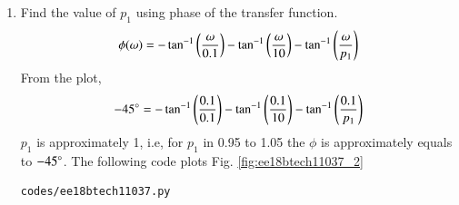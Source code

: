 \begin{enumerate}[label=\thesubsection.\arabic*.,ref=\thesubsection.\theenumi]
\item Find the value of $p_1$ using phase of the transfer function.
\\
\solution
\begin{align}
\phi(\omega) = -\tan^{-1} \left(\frac{\omega}{0.1}\right)-\tan^{-1} \left(\frac{\omega}{10}\right)-\tan^{-1} \left(\frac{\omega}{p_1}\right)
\end{align}
From the plot,
\begin{align}
-45\degree = -\tan^{-1}\left(\frac{0.1}{0.1}\right) -\tan^{-1}\left(\frac{0.1}{10}\right) -\tan^{-1}\left(\frac{0.1}{p_1}\right)
\end{align}
 $p_1$ is approximately 1, i.e, for $p_1$ in 0.95 to 1.05 the $\phi$ is approximately equals to $-45\degree$.
%
The following code plots Fig. \ref{fig:ee18btech11037_2}

\begin{lstlisting}
codes/ee18btech11037.py
\end{lstlisting}

\end{enumerate}
